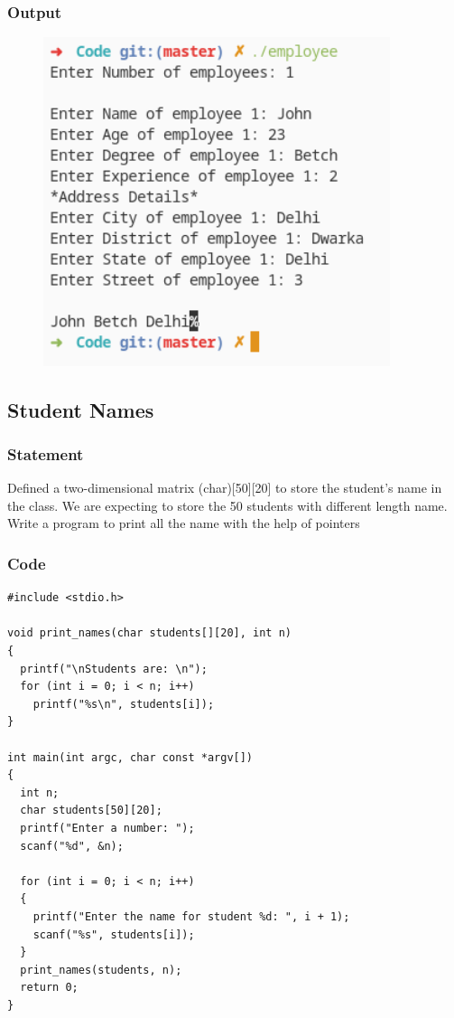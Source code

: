 \subsubsection{Output}
\begin{figure}[!htb]
  \centering
  \includegraphics[width=4in]{Images/employee.png}
  \label{output:4}
\end{figure}


\pagebreak
\subsection{Student Names}

\subsubsection{Statement}
Defined a two-dimensional matrix (char)[50][20] to store the student’s name in the class.
We are expecting to store the 50 students with different length name. Write a program to print all
the name with the help of pointers

\subsubsection{Code}
\begin{verbatim} 
#include <stdio.h>

void print_names(char students[][20], int n)
{
  printf("\nStudents are: \n");
  for (int i = 0; i < n; i++)
    printf("%s\n", students[i]);
}

int main(int argc, char const *argv[])
{
  int n;
  char students[50][20];
  printf("Enter a number: ");
  scanf("%d", &n);

  for (int i = 0; i < n; i++)
  {
    printf("Enter the name for student %d: ", i + 1);
    scanf("%s", students[i]);
  }
  print_names(students, n);
  return 0;
}

\end{verbatim}
